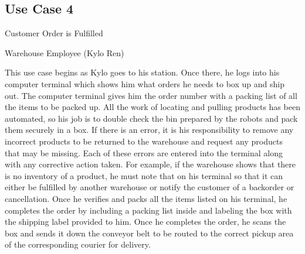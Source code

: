 \subsection{Use Case 4}
\begin{description}[font=\bfseries\itshape]
\item[Title:]Customer Order is Fulfilled
\item[Actors:]Warehouse Employee (Kylo Ren)
\item[Description:]This use case begins as Kylo goes to his station.  Once there, he logs into his computer terminal which shows him what orders he needs to box up and ship out. The computer terminal gives him the order number with a packing list of all the items to be packed up.  All the work of locating and pulling products has been automated, so his job is to double check the bin prepared by the robots and pack them securely in a box.  If there is an error, it is his responsibility to remove any incorrect products to be returned to the warehouse and request any products that may be missing.  Each of these errors are entered into the terminal along with any corrective action taken.  For example, if the warehouse shows that there is no inventory of a product, he must note that on his terminal so that it can either be fulfilled by another warehouse or notify the customer of a backorder or cancellation.  Once he verifies and packs all the items listed on his terminal, he completes the order by including a packing list inside and labeling the box with the shipping label provided to him.  Once he completes the order, he scans the box and sends it down the conveyor belt to be routed to the correct pickup area of the corresponding courier for delivery.
\end{description}

